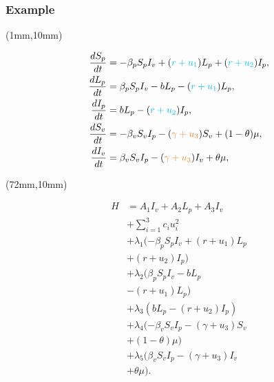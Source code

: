 %
\begin{frame}[plain]
    \frametitle{Example}
    \begin{textblock*}{70mm}(1mm,10mm)
        \begin{greenbox}{}
            \begin{align*}
                \frac{dS_p}{dt} &=
                    -\beta_p S_p I_v +(\textcolor{capri}{r +u_1})L_p + 
                    (\textcolor{capri}{r + u_2}) I_p,
                \\
                \frac{dL_p}{dt} &=
                    \beta_p S_p I_v -b L_p -(\textcolor{capri}{r + u_1})L_p,
                \\
                \frac{dI_p}{dt} &= 
                    b L_p - (\textcolor{capri}{r + u_2}) I_p,
                \\
                \frac{dS_v}{dt} &=
                    -\beta_v S_v I_p - 
                        (\textcolor{cadmiumorange}{\gamma+u_3}) S_v 
                        +(1-\theta)\mu,
                \\
                \frac{dI_v}{dt} &=
                    \beta_v S_v I_p 
                    -(\textcolor{cadmiumorange}{\gamma+u_3}) I_v 
                    +\theta\mu,
            \end{align*}
        \end{greenbox}
    \end{textblock*}
    \begin{textblock*}{55mm}(72mm,10mm)
        \begin{greenbox}{}
            \begin{align*}
                H
                    &= A_1 I_v + A_2 L_p + A_3 I_v
                    \\
                & + \sum_{i=1}^{3}c_iu_i^2
                    \\
                & + \lambda_1 ( -\beta_p S_p I_v + (r +u_1) L_p
                    \\
                & + (r + u_2) I_p)
                \\
                & + \lambda_2(\beta_p S_p I_v -b L_p
                \\
                &-(r + u_1)L_p)
                \\
                & + \lambda_3(b L_p - (r + u_2) I_p)
                \\
                & +\lambda_4(-\beta_v S_v I_p - (\gamma+u_3) S_v
                \\
                & + (1-\theta) \mu)
                \\
                & +
                \lambda_5(\beta_v S_v I_p -(\gamma+u_3) I_v
                \\
                & +\theta\mu).
            \end{align*}
        \end{greenbox}
    \end{textblock*}
\end{frame}
